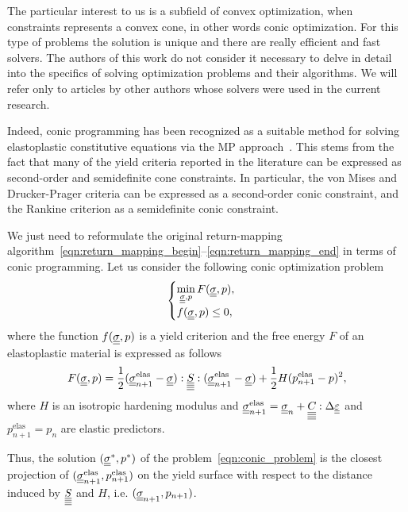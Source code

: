 \documentclass[12pt]{article}
\begin{document}
The particular interest to us is a subfield of convex optimization, when constraints represents a convex cone, in other words conic optimization. For this type of problems the solution is unique and there are really efficient and fast solvers. The authors of this work do not consider it necessary to delve in detail into the specifics of solving optimization problems and their algorithms. We will refer only to articles by other authors whose solvers were used in the current research.

Indeed, conic programming has been recognized as a suitable method for solving elastoplastic constitutive equations via the MP approach~\parencite{BRUNO2020724}. This stems from the fact that many of the yield criteria reported in the literature can be expressed as second-order and semidefinite cone constraints. In particular, the von Mises and Drucker-Prager criteria can be expressed as a second-order conic constraint, and the Rankine criterion as a semidefinite conic constraint. 

We just need to reformulate the original return-mapping algorithm~\eqref{eqn:return_mapping_begin}--\eqref{eqn:return_mapping_end} in terms of conic programming. Let us consider the following conic optimization problem
\begin{equation}
    \label{eqn:conic_problem}
    \begin{cases}
        \min\limits_{\underline{\underline{\sigma}}, p} F(\underline{\underline{\sigma}}, p), \\
        f(\underline{\underline{\sigma}}, p) \leq 0,
    \end{cases}
\end{equation}
where the function $f(\underline{\underline{\sigma}}, p)$ is a yield criterion and the free energy $F$ of an elastoplastic material is expressed as follows
\begin{equation}
    F(\underline{\underline{\sigma}}, p) = \frac{1}{2}(\underline{\underline{\sigma}}_{n+1}^{\text{elas}} - \underline{\underline{\sigma}}) : \underline{\underline{\underline{\underline{S}}}} : (\underline{\underline{\sigma}}_{n+1}^{\text{elas}} - \underline{\underline{\sigma}}) + \frac{1}{2}H(p_{n+1}^\text{elas} - p)^2,
\end{equation}
where $H$ is an isotropic hardening modulus and $\underline{\underline{\sigma}}_{n+1}^{\text{elas}} = \underline{\underline{\sigma}}_n + \underline{\underline{\underline{\underline{C_{}}}}}:\Delta\underline{\underline{\varepsilon}}$ and $p^\text{elas}_{n+1} = p_n$ are elastic predictors.

Thus, the solution $(\underline{\underline{\sigma}}^*, p^*)$ of the problem~\eqref{eqn:conic_problem} is the closest projection of $(\underline{\underline{\sigma}}_{n+1}^{\text{elas}}, p_{n+1}^\text{elas})$ on the yield surface with respect to the distance induced by $\underline{\underline{\underline{\underline{S}}}}$ and $H$, i.e. $(\underline{\underline{\sigma}}_{n+1}, p_{n+1})$.
\end{document}
